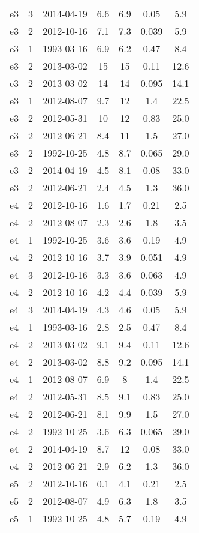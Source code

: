 \begin{table*}[htp]
\begin{tabular}{ccccccc}
e3 & 3 & 2014-04-19 & 6.6 & 6.9 & 0.05 & 5.9 \\
e3 & 2 & 2012-10-16 & 7.1 & 7.3 & 0.039 & 5.9 \\
e3 & 1 & 1993-03-16 & 6.9 & 6.2 & 0.47 & 8.4 \\
e3 & 2 & 2013-03-02 & 15 & 15 & 0.11 & 12.6 \\
e3 & 2 & 2013-03-02 & 14 & 14 & 0.095 & 14.1 \\
e3 & 1 & 2012-08-07 & 9.7 & 12 & 1.4 & 22.5 \\
e3 & 2 & 2012-05-31 & 10 & 12 & 0.83 & 25.0 \\
e3 & 2 & 2012-06-21 & 8.4 & 11 & 1.5 & 27.0 \\
e3 & 2 & 1992-10-25 & 4.8 & 8.7 & 0.065 & 29.0 \\
e3 & 2 & 2014-04-19 & 4.5 & 8.1 & 0.08 & 33.0 \\
e3 & 2 & 2012-06-21 & 2.4 & 4.5 & 1.3 & 36.0 \\
e4 & 2 & 2012-10-16 & 1.6 & 1.7 & 0.21 & 2.5 \\
e4 & 2 & 2012-08-07 & 2.3 & 2.6 & 1.8 & 3.5 \\
e4 & 1 & 1992-10-25 & 3.6 & 3.6 & 0.19 & 4.9 \\
e4 & 2 & 2012-10-16 & 3.7 & 3.9 & 0.051 & 4.9 \\
e4 & 3 & 2012-10-16 & 3.3 & 3.6 & 0.063 & 4.9 \\
e4 & 2 & 2012-10-16 & 4.2 & 4.4 & 0.039 & 5.9 \\
e4 & 3 & 2014-04-19 & 4.3 & 4.6 & 0.05 & 5.9 \\
e4 & 1 & 1993-03-16 & 2.8 & 2.5 & 0.47 & 8.4 \\
e4 & 2 & 2013-03-02 & 9.1 & 9.4 & 0.11 & 12.6 \\
e4 & 2 & 2013-03-02 & 8.8 & 9.2 & 0.095 & 14.1 \\
e4 & 1 & 2012-08-07 & 6.9 & 8 & 1.4 & 22.5 \\
e4 & 2 & 2012-05-31 & 8.5 & 9.1 & 0.83 & 25.0 \\
e4 & 2 & 2012-06-21 & 8.1 & 9.9 & 1.5 & 27.0 \\
e4 & 2 & 1992-10-25 & 3.6 & 6.3 & 0.065 & 29.0 \\
e4 & 2 & 2014-04-19 & 8.7 & 12 & 0.08 & 33.0 \\
e4 & 2 & 2012-06-21 & 2.9 & 6.2 & 1.3 & 36.0 \\
e5 & 2 & 2012-10-16 & 0.1 & 4.1 & 0.21 & 2.5 \\
e5 & 2 & 2012-08-07 & 4.9 & 6.3 & 1.8 & 3.5 \\
e5 & 1 & 1992-10-25 & 4.8 & 5.7 & 0.19 & 4.9 \\

\end{tabular}
\end{table*}
